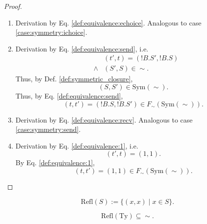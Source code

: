 \documentclass{llncs}
\newcommand*{\Sym}{\mathrm{Sym}}
\newcommand*{\Refl}{\mathrm{Refl}}
\newcommand*{\Ty}{\mathrm{Ty}}
\newcommand*{\sequiv}{\sim}
\newcommand*{\send}{\mathord{!}}
\renewcommand*{\|}{\;|\;}
\begin{document}
\begin{proof}
\begin{enumerate}
    \item
      \label{case:symmetry:echoice}
      Derivation by Eq. \ref{def:equivalence:echoice}. Analogous to case
      \ref{case:symmetry:ichoice}.

    \item
      \label{case:symmetry:send}
      Derivation by Eq. \ref{def:equivalence:send}, i.e.
      \begin{eqnarray*}
        &&      (t', t) = (\send B.S', \send B.S) \\
        &\land& (S', S) \in \sequiv.
      \end{eqnarray*}
      Thus, by Def. \ref{def:symmetric_closure},
      \begin{equation*}
        (S, S') \in \Sym(\sequiv).
      \end{equation*}
      Thus, by Eq. \ref{def:equivalence:send},
      \begin{equation*}
        (t, t') = (\send B.S, \send B.S') \in F_\sequiv(\Sym(\sequiv)).
      \end{equation*}

    \item
      \label{case:symmetry:recv}
      Derivation by Eq. \ref{def:equivalence:recv}. Analogous to case
      \ref{case:symmetry:send}.

    \item
      \label{case:symmetry:1}
      Derivation by Eq. \ref{def:equivalence:1}, i.e.
      \begin{equation*}
        (t', t) = (1, 1).
      \end{equation*}
      By Eq. \ref{def:equivalence:1},
      \begin{equation*}
        (t, t') = (1, 1) \in F_\sequiv(\Sym(\sequiv)).
      \end{equation*}
  \end{enumerate}
\end{proof}

\begin{definition}
  \label{def:reflexive_closure}
  \begin{equation*}
    \Refl(S) := \{ (x, x) \| x \in S \}.
  \end{equation*}
\end{definition}

\begin{theorem}[Reflexivity of $\sequiv$]
  \label{th:reflexivity}
  \begin{equation*}
    \Refl(\Ty) \subseteq \sequiv.
  \end{equation*}
\end{theorem}
\end{document}
